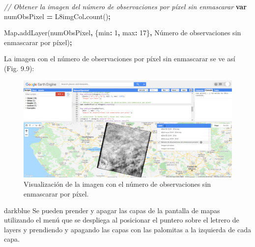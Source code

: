 \documentclass[
  12pt,
  letterpaper,
  twoside]{book}
\newenvironment{Shaded}{\begin{snugshade}}{\end{snugshade}}
\newcommand{\BuiltInTok}[1]{#1}
\newcommand{\CommentTok}[1]{\textcolor[rgb]{0.56,0.35,0.01}{\textit{#1}}}
\newcommand{\DataTypeTok}[1]{\textcolor[rgb]{0.13,0.29,0.53}{#1}}
\newcommand{\DecValTok}[1]{\textcolor[rgb]{0.00,0.00,0.81}{#1}}
\newcommand{\FunctionTok}[1]{\textcolor[rgb]{0.00,0.00,0.00}{#1}}
\newcommand{\KeywordTok}[1]{\textcolor[rgb]{0.13,0.29,0.53}{\textbf{#1}}}
\newcommand{\NormalTok}[1]{#1}
\newcommand{\OperatorTok}[1]{\textcolor[rgb]{0.81,0.36,0.00}{\textbf{#1}}}
\newcommand{\StringTok}[1]{\textcolor[rgb]{0.31,0.60,0.02}{#1}}
\begin{document}
\begin{Shaded}
\begin{Highlighting}[]
\CommentTok{// Obtener la imagen del número de observaciones por píxel sin enmascarar }
\KeywordTok{var}\NormalTok{ numObsPixel }\OperatorTok{=}\NormalTok{ L8imgCol}\OperatorTok{.}\FunctionTok{count}\NormalTok{()}\OperatorTok{;}

\BuiltInTok{Map}\OperatorTok{.}\FunctionTok{addLayer}\NormalTok{(numObsPixel}\OperatorTok{,}
\NormalTok{  \{}\DataTypeTok{min}\OperatorTok{:} \DecValTok{1}\OperatorTok{,} \DataTypeTok{max}\OperatorTok{:} \DecValTok{17}\NormalTok{\}}\OperatorTok{,}
  \StringTok{\textquotesingle{}Número de observaciones sin enmascarar por píxel\textquotesingle{}}\NormalTok{)}\OperatorTok{;}
\end{Highlighting}
\end{Shaded}

La imagen con el número de observaciones por píxel sin enmascarar se ve así (Fig. 9.9):

\begin{figure}[btp]

{\centering \includegraphics[width=1\linewidth]{Img/imCount} 

}

\caption{Visualización de la imagen con el número de observaciones sin enmascarar por píxel.}\label{fig:unnamed-chunk-166}
\end{figure}

\begin{bluebox2}

\begin{awesomeblock}{5pt}{\faLightbulb}{darkblue}
Se pueden prender y apagar las capas de la pantalla de mapas utilizando el menú que se despliega al posicionar el puntero sobre el letrero de layers y prendiendo y apagando las capas con las palomitas a la izquierda de cada capa.

\end{awesomeblock}

\end{bluebox2}
\end{document}
